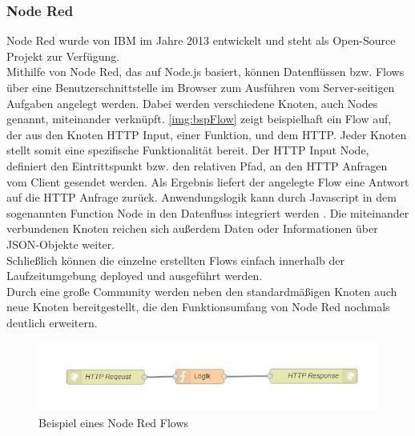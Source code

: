 \subsubsection{Node Red}
Node Red wurde von IBM im Jahre 2013 entwickelt und steht als Open-Source Projekt zur Verfügung\cite{nodeRed:nodeRedAbout}.\\
Mithilfe von Node Red, das auf Node.js basiert, können Datenflüssen bzw. Flows über eine Benutzerschnittstelle im Browser zum Ausführen vom Server-seitigen Aufgaben angelegt werden. Dabei werden verschiedene Knoten, auch Nodes genannt, miteinander verknüpft. \autoref{img:bspFlow} zeigt beispielhaft ein Flow auf, der aus den Knoten \acf{HTTP} Input, einer Funktion, und dem \ac{HTTP}. Jeder Knoten stellt somit eine spezifische Funktionalität bereit. Der \ac{HTTP} Input Node, definiert den Eintrittspunkt bzw. den relativen Pfad, an den \ac{HTTP} Anfragen vom Client gesendet werden. Als Ergebnis liefert der angelegte Flow eine Antwort auf die \ac{HTTP} Anfrage zurück. Anwendungslogik kann durch Javascript in dem sogenannten Function Node in den Datenfluss integriert werden . Die miteinander verbundenen Knoten reichen sich außerdem Daten oder Informationen über \ac{JSON}-Objekte weiter.
\\Schließlich können die einzelne erstellten Flows einfach innerhalb der Laufzeitumgebung deployed und ausgeführt werden. \\Durch eine große Community werden neben den standardmäßigen Knoten auch neue Knoten bereitgestellt, die den Funktionsumfang von Node Red nochmals deutlich erweitern\cite{nodeRed:nodeRed}.
\begin{figure}[H]
	\centering	
	\includegraphics[scale=0.8]{images/bspFlow}
	\caption{Beispiel eines Node Red Flows}
	\label{img:bspFlow}
\end{figure}





